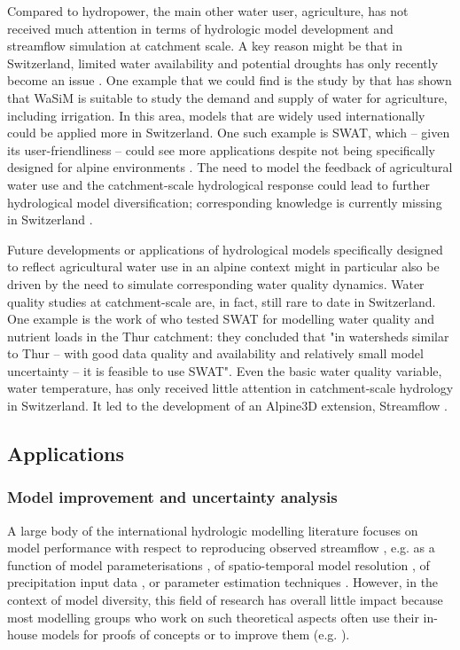 \documentclass[10pt,a4paper]{article}
\begin{document}
Compared to hydropower, the main other water user, agriculture, has not received much attention in terms of hydrologic model development and streamflow simulation at catchment scale. A key reason might be that in Switzerland, limited water availability and potential droughts has only recently become an issue \citep{FOEN2021}. One example that we could find is the study by \citet{Fuhrer2012} that has shown that WaSiM is suitable to study the demand and supply of water for agriculture, including irrigation. In this area, models that are widely used internationally could be applied more in Switzerland. One such example is SWAT, which -- given its user-friendliness \citep{Abbaspour2007} -- could see more applications despite not being specifically designed for alpine environments \citep{Rahman2014, Andrianaki2019}. The need to model the feedback of agricultural water use and the catchment-scale hydrological response could lead to further hydrological model diversification; corresponding knowledge is currently missing in Switzerland \citep{FOEN2021}.

Future developments or applications of hydrological models specifically designed to reflect agricultural water use in an alpine context might in particular also be driven by the need to simulate corresponding water quality dynamics. Water quality studies at catchment-scale are, in fact, still rare to date in Switzerland. One example is the work of \citet{Abbaspour2007} who tested SWAT for modelling water quality and nutrient loads in the Thur catchment: they concluded that "in watersheds similar to Thur – with good data quality and availability and relatively small model uncertainty – it is feasible to use SWAT". Even the basic water quality variable, water temperature, has only received little attention in catchment-scale hydrology in Switzerland. It led to the development of an Alpine3D extension, Streamflow \citep{Gallice2016, Michel2021}.


\subsection{Applications}
\label{sec:context:application}


\subsubsection{Model improvement and uncertainty analysis}
\label{sec:context:uncertainty}

A large body of the international hydrologic modelling literature focuses on model performance with respect to reproducing observed streamflow \citep{Clark2011a, Beven2011}, e.g. as a function of model parameterisations \citep{GironsLopez2020}, of spatio-temporal model resolution \citep{Brunner2019}, of precipitation input data \citep{Sikorska2016, Sikorska2017, MullerThomy2019}, or parameter estimation techniques \citep{Foglia2009, Cullmann2011}. However, in the context of model diversity, this field of research has overall little impact because most modelling groups who work on such theoretical aspects often use their in-house models for proofs of concepts or to improve them (e.g. \citealt{Schaefli2007, Hingray2010}).
\end{document}
